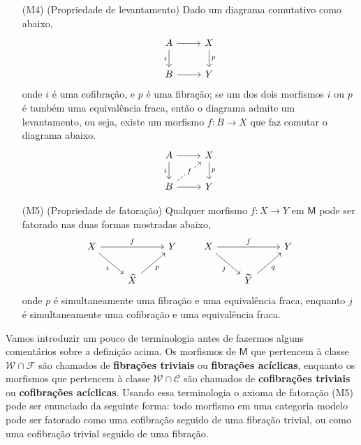 \begin{defin}
\begin{enumerate}
  \item[(M4)] (Propriedade de levantamento) Dado um diagrama comutativo como abaixo,
    \begin{displaymath}
      \begin{tikzcd}
        A
        \arrow[r]
        \arrow[d, "i" swap]
        & X
        \arrow[d, "p"]
        \\ B
        \arrow[r]
        & Y
      \end{tikzcd}
    \end{displaymath}
    onde $i$ é uma cofibração, e $p$ é uma fibração; se um dos dois morfismos $i$ ou $p$ é também uma equivalência fraca, então o diagrama admite um levantamento, ou seja, existe um morfismo $f: B \to X$ que faz comutar o diagrama abaixo.
    \begin{displaymath}
      \begin{tikzcd}
        A
        \arrow[r]
        \arrow[d, "i" swap]
        & X
        \arrow[d, "p"]
        \\ B
        \arrow[r]
        \arrow[ru, dashed, "f" description]
        & Y
      \end{tikzcd}
    \end{displaymath}
    
  \item[(M5)] (Propriedade de fatoração) Qualquer morfismo $f: X \to Y$ em $\mathsf{M}$ pode ser fatorado nas duas formas mostradas abaixo,
    \begin{displaymath}
      \begin{tikzcd}
        X
        \arrow[rr, "f"]
        \arrow[rd, "i" swap]
        & & Y
        \\ & \widehat{X}
        \arrow[ru, "p" swap]
      \end{tikzcd}
      \qquad
      \begin{tikzcd}
        X
        \arrow[rr, "f"]
        \arrow[rd, "j" swap]
        & &
        Y
        \\ & \widetilde{Y}
        \arrow[ru, "q" swap]
      \end{tikzcd}
    \end{displaymath}
    onde $p$ é simultaneamente uma fibração e uma equivalência fraca, enquanto $j$ é simultaneamente uma cofibração e uma equivalência fraca.
  \end{enumerate}
\end{defin}

Vamos introduzir um pouco de terminologia antes de fazermos alguns comentários sobre a definição acima.
Os morfismos de $\mathsf{M}$ que pertencem à classe $\mathcal{W} \cap \mathcal{F}$ são chamados de \textbf{fibrações triviais} ou \textbf{fibrações acíclicas}, enquanto os morfismos que pertencem à classe $\mathcal{W} \cap \mathcal{C}$ são chamados de \textbf{cofibrações triviais} ou \textbf{cofibrações acíclicas}.
Usando essa terminologia o axioma de fatoração (M5) pode ser enunciado da seguinte forma: todo morfismo em uma categoria modelo pode ser fatorado como uma cofibração seguido de uma fibração trivial, ou como uma cofibração trivial seguido de uma fibração.

